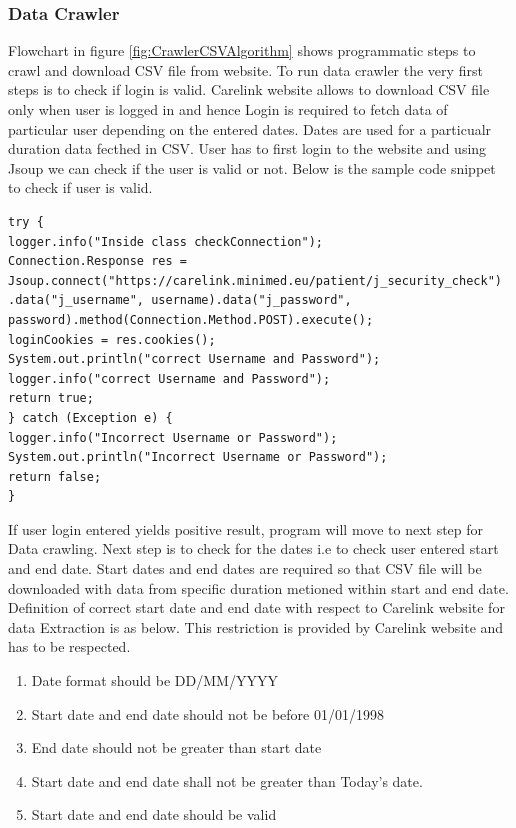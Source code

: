 \documentclass[article,type=msc,colorback,accentcolor=tud9c,twoside,11pt]{tudthesis}
\begin{document}
 
\subsubsection{Data Crawler}
\label{subsec:DataCrawler}
 Flowchart in figure \ref{fig:CrawlerCSVAlgorithm} shows programmatic steps to crawl and download CSV file from website. To run data crawler the very first steps is to check if login is valid. Carelink website allows to download CSV file only when user is logged in and hence Login is required to fetch data of particular user depending on the entered dates. Dates are used for a particualr duration data fecthed in CSV. User has to first login to the website and using Jsoup we can check if the user is valid or not. Below is the sample code snippet to check if user is valid.
\begin{lstlisting}
try {
logger.info("Inside class checkConnection");
Connection.Response res = Jsoup.connect("https://carelink.minimed.eu/patient/j_security_check")
.data("j_username", username).data("j_password", password).method(Connection.Method.POST).execute();
loginCookies = res.cookies();
System.out.println("correct Username and Password");
logger.info("correct Username and Password");
return true;
} catch (Exception e) {
logger.info("Incorrect Username or Password");
System.out.println("Incorrect Username or Password");
return false;
}
\end{lstlisting}
If user login entered yields positive result, program will move to next step for Data crawling. Next step is to check for the dates i.e to check user entered start and end date. Start dates and end dates are required so that CSV file will be downloaded with data from specific duration metioned within start and end date. Definition of correct start date and end date with respect to Carelink website for data Extraction is as below. This restriction is provided by Carelink website and has to be respected.
\begin{enumerate}
\item Date format should be DD/MM/YYYY
\item Start date and end date should not be before 01/01/1998
\item End date should not be greater than start date
\item Start date and end date shall not be greater than Today's date.
\item Start date and end date should be valid
\end{enumerate}
\end{document}
